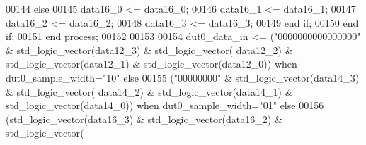 \begin{DoxyCode}
00144          \textcolor{keywordflow}{else} 
00145             \textcolor{vhdlchar}{data16_0} \textcolor{vhdlchar}{<=} \textcolor{vhdlchar}{data16_0};
00146             \textcolor{vhdlchar}{data16_1} \textcolor{vhdlchar}{<=} \textcolor{vhdlchar}{data16_1};
00147             \textcolor{vhdlchar}{data16_2} \textcolor{vhdlchar}{<=} \textcolor{vhdlchar}{data16_2};
00148             \textcolor{vhdlchar}{data16_3} \textcolor{vhdlchar}{<=} \textcolor{vhdlchar}{data16_3}; 
00149          \textcolor{keywordflow}{end} \textcolor{keywordflow}{if};
00150       \textcolor{keywordflow}{end} \textcolor{keywordflow}{if};
00151    \textcolor{keywordflow}{end} \textcolor{keywordflow}{process};
00152    
00153    
00154    \textcolor{vhdlchar}{dut0_data_in} \textcolor{vhdlchar}{<=}   \textcolor{vhdlchar}{(}\textcolor{vhdllogic}{"0000000000000000"} \textcolor{vhdlchar}{&} \textcolor{comment}{std\_logic\_vector}\textcolor{vhdlchar}{(}\textcolor{vhdlchar}{data12_3}\textcolor{vhdlchar}{)} \textcolor{vhdlchar}{&} \textcolor{comment}{std\_logic\_vector}\textcolor{vhdlchar}{(}\textcolor{vhdlchar}{
      data12_2}\textcolor{vhdlchar}{)} \textcolor{vhdlchar}{&} \textcolor{comment}{std\_logic\_vector}\textcolor{vhdlchar}{(}\textcolor{vhdlchar}{data12_1}\textcolor{vhdlchar}{)} \textcolor{vhdlchar}{&} \textcolor{comment}{std\_logic\_vector}\textcolor{vhdlchar}{(}\textcolor{vhdlchar}{data12_0}\textcolor{vhdlchar}{)}\textcolor{vhdlchar}{)} \textcolor{keywordflow}{when} \textcolor{vhdlchar}{
      dut0_sample_width}\textcolor{vhdlchar}{=}\textcolor{vhdllogic}{"10"} \textcolor{keywordflow}{else} 
00155                      \textcolor{vhdlchar}{(}\textcolor{vhdllogic}{"00000000"} \textcolor{vhdlchar}{&} \textcolor{comment}{std\_logic\_vector}\textcolor{vhdlchar}{(}\textcolor{vhdlchar}{data14_3}\textcolor{vhdlchar}{)} \textcolor{vhdlchar}{&} \textcolor{comment}{std\_logic\_vector}\textcolor{vhdlchar}{(}\textcolor{vhdlchar}{
      data14_2}\textcolor{vhdlchar}{)} \textcolor{vhdlchar}{&} \textcolor{comment}{std\_logic\_vector}\textcolor{vhdlchar}{(}\textcolor{vhdlchar}{data14_1}\textcolor{vhdlchar}{)} \textcolor{vhdlchar}{&} \textcolor{comment}{std\_logic\_vector}\textcolor{vhdlchar}{(}\textcolor{vhdlchar}{data14_0}\textcolor{vhdlchar}{)}\textcolor{vhdlchar}{)} \textcolor{keywordflow}{when} \textcolor{vhdlchar}{
      dut0_sample_width}\textcolor{vhdlchar}{=}\textcolor{vhdllogic}{"01"} \textcolor{keywordflow}{else} 
00156                      \textcolor{vhdlchar}{(}\textcolor{comment}{std\_logic\_vector}\textcolor{vhdlchar}{(}\textcolor{vhdlchar}{data16_3}\textcolor{vhdlchar}{)} \textcolor{vhdlchar}{&} \textcolor{comment}{std\_logic\_vector}\textcolor{vhdlchar}{(}\textcolor{vhdlchar}{data16_2}\textcolor{vhdlchar}{)} \textcolor{vhdlchar}{&} \textcolor{comment}{std\_logic\_vector}\textcolor{vhdlchar}{(}\textcolor{vhdlchar}{
}
\end{DoxyCode}
